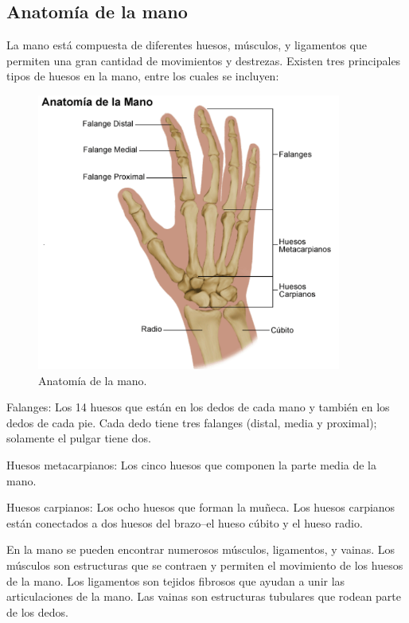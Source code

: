 \documentclass{article}
\begin{document}
\subsection{Anatomía de la mano}
La mano está compuesta de diferentes huesos, músculos, y ligamentos que permiten una gran cantidad de movimientos y destrezas. Existen tres principales tipos de huesos en la mano, entre los cuales se incluyen: 

\begin{figure}[H] %
    \centering
    \includegraphics[width=100mm]{mano.png} %
    \caption{Anatomía de la mano\cite{ff3}.}
    \label{grafica:dos}
\end{figure}

Falanges: Los 14 huesos que están en los dedos de cada mano y también en los dedos de cada pie. Cada dedo tiene tres falanges (distal, media y proximal); solamente el pulgar tiene dos\cite{ff3}. 

Huesos metacarpianos: Los cinco huesos que componen la parte media de la mano\cite{ff3}. 

Huesos carpianos: Los ocho huesos que forman la muñeca. Los huesos carpianos están conectados a dos huesos del brazo--el hueso cúbito y el hueso radio\cite{ff3}. 

En la mano se pueden encontrar numerosos músculos, ligamentos, y vainas. Los músculos son estructuras que se contraen y permiten el movimiento de los huesos de la mano. Los ligamentos son tejidos fibrosos que ayudan a unir las articulaciones de la mano. Las vainas son estructuras tubulares que rodean parte de los dedos\cite{ff3}. 
\end{document}
